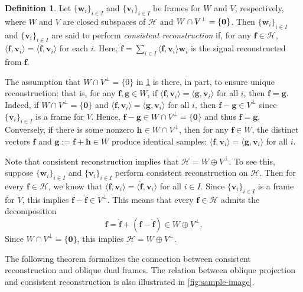 \documentclass{amsart}
\numberwithin{equation}{section}
\newcommand{\cH}{{\mathcal H}}
\theoremstyle{plain}
\theoremstyle{remark}
\theoremstyle{definition}
\newtheorem{definition}[theorem]{Definition}
\begin{document}
\begin{definition}\label{def:consistRecons}
 Let $\{\mathbf{w}_i\}_{i\in I}$ and $\{\mathbf{v}_i\}_{i\in I}$ be frames for $W$ and $V$, respectively,  where $W$ and $V$ are closed subspaces of $\cH$ and $W \cap V^\perp =\{\bf 0\}$. Then $\{\mathbf{w}_i\}_{i\in I}$ and $\{\mathbf{v}_i\}_{i\in I}$ are said to perform \emph{consistent reconstruction} if, for any $\mathbf{f} \in \mathcal{H}$, $\langle \mathbf{f}, \mathbf{v}_i \rangle = \langle \hat{\mathbf{f}}, \mathbf{v}_i \rangle$ for each $i$. Here, $\hat{\mathbf{f}} = \sum_{i \in I} \langle \mathbf{f}, \mathbf{v}_i \rangle \mathbf{w}_i$ is the signal reconstructed from $\mathbf{f}$. 
\end{definition}


The assumption that $W \cap V^\perp =\{0\}$ in \cref{def:consistRecons} is there, in part, to ensure unique reconstruction: that is, for any $\mathbf{f}, \mathbf{g} \in W$, if $\langle \mathbf{f}, \mathbf{v}_i\rangle = \langle \mathbf{g}, \mathbf{v}_i\rangle$ for all $i$,
then $\mathbf{f}=\mathbf{g}$. Indeed, if $W \cap V^\perp = \{\mathbf{0}\}$ and $\langle \mathbf{f}, \mathbf{v}_i \rangle = \langle \mathbf{g}, \mathbf{v}_i \rangle$ for all $i$, then $\mathbf{f-g} \in V^\perp$ since $\{\mathbf{v}_i\}_{i \in I}$ is a frame for $V$. Hence, $\mathbf{f-g} \in W \cap V^\perp = \{\mathbf{0}\}$ and thus $\mathbf{f} = \mathbf{g}$. Conversely, if there is some nonzero $\mathbf{h} \in W \cap V^\perp$, then for any $\mathbf{f} \in W$, the distinct vectors $\mathbf{f}$ and $\mathbf{g} := \mathbf{f}+\mathbf{h} \in W$ produce identical samples: $\langle \mathbf{f}, \mathbf{v}_i\rangle = \langle \mathbf{g}, \mathbf{v}_i\rangle$ for all $i$. 


Note that consistent reconstruction implies that $\cH = W \oplus V^\perp$. To see this, suppose $\{\mathbf{w}_i\}_{i \in I}$ and $\{\mathbf{v}_i\}_{i \in I}$ perform consistent reconstruction on $\mathcal{H}$. Then for every $ \mathbf{f} \in \mathcal{H}$, we know that $\langle \mathbf{f}, \mathbf{v}_i \rangle = \langle \hat{\mathbf{f}}, \mathbf{v}_i \rangle$ for all $i \in I$. Since $\{\mathbf{v}_i\}_{i \in I}$ is a frame for $V$, this implies $\mathbf{f}-\hat{\mathbf{f}} \in V^\perp$. This means that every $\mathbf{f} \in \mathcal{H}$ admits the decomposition
\[
    \mathbf{f} = \hat{\mathbf{f}} + (\mathbf{f}-\hat{\mathbf{f}}) \in W \oplus V^\perp.
\]
Since $W \cap V^\perp = \{\mathbf{0}\}$, this implies $\mathcal{H} = W \oplus V^\perp$.


The following theorem formalizes the connection between consistent reconstruction and oblique dual frames. The relation between oblique projection and consistent reconstruction is also illustrated in \cref{fig:sample-image}. 
\end{document}
